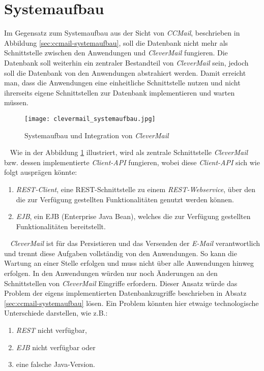 \section{Systemaufbau}
Im Gegensatz zum Systemaufbau aus der Sicht von \emph{CCMail}, beschrieben in Abbildung \ref{sec:ccmail-systemaufbau}, soll die Datenbank nicht mehr als Schnittstelle zwischen den Anwendungen und \emph{CleverMail} fungieren. Die Datenbank soll weiterhin ein zentraler Bestandteil von \emph{CleverMail} sein, jedoch soll die Datenbank von den Anwendungen abstrahiert werden. Damit erreicht man, dass die Anwendungen eine einheitliche Schnittstelle nutzen und nicht ihrerseits eigene Schnittstellen zur Datenbank implementieren und warten müssen.
\newpage
\begin{figure}[h]
\centering
\texttt{[image: clevermail\_systemaufbau.jpg]} %
\caption{Systemaufbau und Integration von \emph{CleverMail}}
\label{fig:clevermail-system-und-integration}
\end{figure}
\ \newline
Wie in der Abbildung \ref{fig:clevermail-system-und-integration} illustriert, wird als zentrale Schnittstelle \emph{CleverMail} bzw. dessen implementierte \emph{Client-API} fungieren, wobei diese \emph{Client-API} sich wie folgt ausprägen könnte:
\begin{enumerate}
	\item\emph{REST-Client}, eine REST-Schnittstelle zu einem \emph{REST-Webservice}, über den die zur Verfügung gestellten Funktionalitäten genutzt werden können.
	\item\emph{EJB}, ein EJB (Enterprise Java Bean), welches die zur Verfügung gestellten Funktionalitäten bereitstellt.
\end{enumerate}
\ \newline
\emph{CleverMail} ist für das Persistieren und das Versenden der \emph{E-Mail} verantwortlich und trennt diese Aufgaben vollständig von den Anwendungen. So kann die Wartung an einer Stelle erfolgen und muss nicht über alle Anwendungen hinweg erfolgen. In den Anwendungen würden nur noch Änderungen an den Schnittstellen von \emph{CleverMail} Eingriffe erfordern.
\newline
\newline
Dieser Ansatz würde das Problem der eigens implementierten Datenbankzugriffe beschrieben in Absatz \ref{sec:ccmail-systemaufbau} lösen. Ein Problem könnten hier etwaige technologische Unterschiede darstellen, wie z.B.:
\begin{enumerate}
	\item \emph{REST} nicht verfügbar,
	\item \emph{EJB} nicht verfügbar oder
	\item eine falsche Java-Version.
\end{enumerate}
